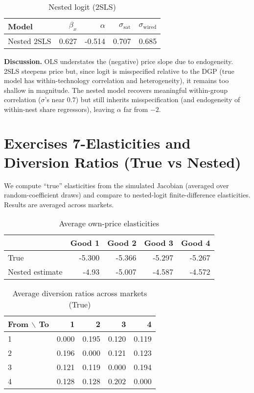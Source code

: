 \documentclass[11pt]{article}
\begin{document}
	\begin{table}[h!]
		\centering
		\caption{Nested logit (2SLS)}
		\label{tab:nested}
		\begin{tabular}{lrrrr}
			\toprule
			Model & $\beta_x$ & $\alpha$ & $\sigma_{\text{sat}}$ & $\sigma_{\text{wired}}$ \\
			\midrule
			Nested 2SLS & 0.627 & -0.514 & 0.707 & 0.685 \\
			\bottomrule
		\end{tabular}
	\end{table}
	
	\noindent
	\textbf{Discussion.} OLS understates the (negative) price slope due to endogeneity. 2SLS steepens price but,
	since logit is misspecified relative to the DGP (true model has within-technology correlation and heterogeneity),
	it remains too shallow in magnitude. The nested model recovers meaningful within-group correlation ($\sigma$'s near
	$0.7$) but still inherits misspecification (and endogeneity of within-nest share regressors), leaving $\alpha$ far from $-2$.
	
	\section*{Exercises 7-Elasticities and Diversion Ratios (True vs Nested)}
	We compute ``true'' elasticities from the simulated Jacobian (averaged over random-coefficient draws)
	and compare to nested-logit finite-difference elasticities. Results are averaged across markets.
	
	\begin{table}[h!]
		\centering
		\caption{Average own-price elasticities}
		\label{tab:own}
		\begin{tabular}{lrrrr}
			\toprule
			& Good 1 & Good 2 & Good 3 & Good 4 \\
			\midrule
			True           & -5.300 & -5.366 & -5.297 & -5.267 \\
			Nested estimate& -4.93 &  -5.007 & -4.587 & -4.572 \\
			\bottomrule
		\end{tabular}
	\end{table}
	
	\begin{table}[h!]
		\centering
		\caption{Average diversion ratios across markets (True)}
		\label{tab:divtrue}
		\begin{tabular}{lrrrr}
			\toprule
			From $\backslash$ To & 1 & 2 & 3 & 4 \\
			\midrule
			1 & 0.000 & 0.195 & 0.120 & 0.119 \\
			2 & 0.196 & 0.000 & 0.121 & 0.123 \\
			3 & 0.121 & 0.119 & 0.000 & 0.194 \\
			4 & 0.128 & 0.128 & 0.202 & 0.000 \\
		
			\bottomrule
		\end{tabular}
	\end{table}
	
\end{document}

